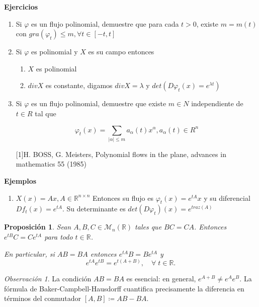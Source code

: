 \documentclass[11pt,a4paper]{article}
\theoremstyle{definition}
\theoremstyle{plain}
\newtheorem{proposicion}{Proposición}[section]
\theoremstyle{remark}
\newtheorem{observacion}{Observación}[section]
\newcommand{\R}{\mathbb R}
\begin{document}
	\textbf{Ejercicios}
	\begin{enumerate}
		\item Si $\varphi$ es un flujo polinomial, demuestre que para cada $t>0$, existe $m=m(t)$ con $gra(\varphi_t)\leq m, \forall t\in [-t,t]$
		\item Si $\varphi$ es polinomial y $X$ es su campo entonces 
		\begin{enumerate}
			\item $X$ es polinomial
			\item $div X$ es constante, digamos $div X = \lambda$ y $det(D\varphi_t(x)= e^{\lambda t})$
		\end{enumerate}
		\item Si $\varphi$ es un flujo polinomial, demuestre que existe $m\in N$ independiente de $t\in R$ tal que
		
		$$\varphi_t(x)=\sum_{|\alpha|\leq m}a_\alpha (t) x^\alpha, a_\alpha(t)\in R^n$$
		
		[1]H. BOSS, G. Meisters, Polynomial flows in the plane, advances in mathematics 55 (1985) 
	\end{enumerate}
	
	\textbf{Ejemplos}
	
	\begin{enumerate}
		\item $X(x)= Ax, A\in \R^{n\times n}$
		Entonces su flujo es $\varphi_t(x)= e^{tA}x$ y su diferencial $Df_t(x)= e^{tA}$. Su determinante es $det(D\varphi_t)(x)= e^{traz(A)}$
	\end{enumerate}
	
	\begin{proposicion}
		Sean $A,B,C\in \mathcal{M}_n(\mathbb{R})$ tales que $BC=CA$. Entonces $e^{tB}C=Ce^{tA}$ para todo $t\in\mathbb{R}$.

		En particular, si $AB=BA$ entonces $e^{tA}B=Be^{tA}$ y
		\[
			e^{tA}e^{tB} = e^{t(A+B)}, \quad \forall\; t\in\mathbb{R}.
		\]
	\end{proposicion}

	\begin{observacion}
		La condición $AB = BA$ es esencial: en general, $e^{A+B} \neq e^A e^B$. La fórmula de Baker-Campbell-Hausdorff cuantifica precisamente la diferencia en términos del conmutador $[A,B] \coloneqq AB - BA$.
	\end{observacion}
\end{document}
